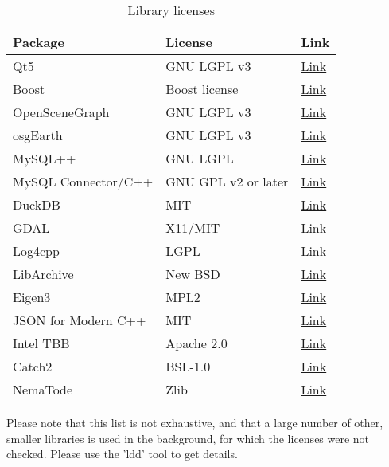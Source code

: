 \begin{table}[H]
  \center
  \begin{tabular}{ | l | l | l |}
    \hline
    \textbf{Package} & \textbf{License} & \textbf{Link} \\ \hline
    Qt5 & GNU LGPL v3 &\href{https://doc.qt.io/qt-5.10/licensing.html}{Link} \\ \hline
    Boost & Boost license  & \href{https://www.boost.org/users/license.html}{Link} \\ \hline
    OpenSceneGraph & GNU LGPL v3 &\href{http://www.openscenegraph.org/index.php/about/licensing}{Link} \\ \hline
    osgEarth & GNU LGPL v3 &\href{hhttps://github.com/gwaldron/osgearth/blob/master/LICENSE.txt}{Link} \\ \hline    
    MySQL++ & GNU LGPL & \href{https://tangentsoft.com/mysqlpp/wiki?name=FAQ}{Link} \\ \hline
    MySQL Connector/C++ & GNU GPL v2 or later & \href{https://downloads.mysql.com/docs/licenses/connector-cpp-gpl-en.pdf}{Link} \\ \hline
    DuckDB & MIT & \href{https://github.com/duckdb/duckdb-web/blob/main/LICENSE}{Link} \\ \hline
    GDAL & X11/MIT & \href{https://trac.osgeo.org/gdal/wiki/FAQGeneral#WhatlicensedoesGDALOGRuse}{Link} \\ \hline
    Log4cpp & LGPL & \href{http://log4cpp.sourceforge.net/#license}{Link} \\ \hline
    LibArchive & New BSD & \href{https://raw.githubusercontent.com/libarchive/libarchive/master/COPYING}{Link} \\ \hline
    Eigen3 & MPL2 & \href{http://eigen.tuxfamily.org/index.php?title=Main_Page}{Link} \\ \hline
    JSON for Modern C++ & MIT & \href{https://github.com/nlohmann/json}{Link} \\ \hline
    Intel TBB & Apache 2.0 & \href{https://www.threadingbuildingblocks.org/}{Link} \\ \hline
    Catch2 & BSL-1.0 & \href{https://github.com/catchorg/Catch2}{Link} \\ \hline
    NemaTode & Zlib & \href{https://github.com/ckgt/NemaTode}{Link} \\ \hline
  \end{tabular}
  \caption{Library licenses}
\end{table}

Please note that this list is not exhaustive, and that a large number of other, smaller libraries is used in the background, for which the licenses were not checked. Please use the 'ldd' tool to get details.

